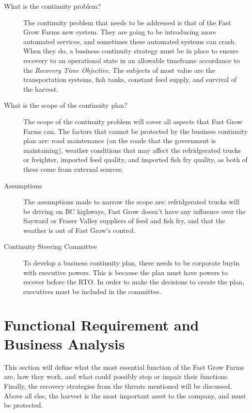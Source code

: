\documentclass{article}
\numberwithin{equation}{section} %
\numberwithin{figure}{section} %
\numberwithin{table}{section} %
\begin{document}
\begin{description}
	\item[What is the continuity problem?] The continuity problem that needs to be addressed is that of the Fast Grow Farms new system.  They are going to be introducing more automated services, and sometimes these automated systems can crash.  When they do, a business continuity strategy must be in place to ensure recovery to an operational state in an allowable timeframe accordance to the \textit{Recovery Time Objective}.  The subjects of most value are the transportation systems, fish tanks, constant feed supply, and survival of the harvest. 
	\item[What is the scope of the continuity plan?]  The scope of the continuity problem will cover all aspects that Fast Grow Farms can.  The factors that cannot be protected by the business continuity plan are: road maintenance (on the roads that the government is maintaining), weather conditions that may affect the refridgerated trucks or freighter, imported feed quality, and imported fish fry quality, as both of these come from external sources.
	\item[Assumptions]  The assumptions made to narrow the scope are: refridgerated trucks will be driving on BC highways, Fast Grow doesn't have any influence over the Sayward or Fraser Valley suppliers of feed and fish fry, and that the weather is out of Fast Grow's control.
	\item[Continuity Steering Committee]  To develop a business continuity plan, there needs to be corporate buyin with executive powers.  This is because the plan must have powers to recover before the RTO.  In order to make the decisions to create the plan, executives must be included in the committee.
\end{description}

\section{Functional Requirement and Business Analysis}
\label{sec:func}
This section will define what the most essential function of the Fast Grow Farms are, how they work, and what could possibly stop or impair their functions.  Finally, the recovery strategies from the threats mentioned will be discussed.  Above all else, the harvest is the most important asset to the company, and must be protected.
\end{document}
